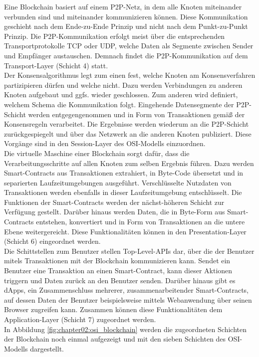 Eine Blockchain basiert auf einem \ac{P2P}-Netz, in dem alle Knoten miteinander verbunden sind und miteinander kommunizieren können. Diese Kommunikation geschieht nach dem Ende-zu-Ende Prinzip und nicht nach dem Punkt-zu-Punkt Prinzip. Die \ac{P2P}-Kommunikation erfolgt meist über die entsprechenden Transportprotokolle TCP oder UDP, welche Daten als Segmente zwischen Sender und Empfänger austauschen. Demnach findet die \ac{P2P}-Kommunikation auf dem Transport-Layer (Schicht 4) statt.\\
Der Konsensalgorithmus legt zum einen fest, welche Knoten am Konsensverfahren partizipieren dürfen und welche nicht. Dazu werden Verbindungen zu anderen Knoten aufgebaut und ggfs. wieder geschlossen. Zum anderen wird definiert, welchem Schema die Kommunikation folgt. Eingehende Datensegmente der \ac{P2P}-Schicht werden entgegengenommen und in Form von Transaktionen gemäß der Konsensregeln verarbeitet. Die Ergebnisse werden wiederum an die \ac{P2P}-Schicht zurückgespiegelt und über das Netzwerk an die anderen Knoten publiziert. Diese Vorgänge sind in den Session-Layer des \ac{OSI}-Modells einzuordnen.\\
Die virtuelle Maschine einer Blockchain sorgt dafür, dass die Verarbeitungsschritte auf allen Knoten zum selben Ergebnis führen. Dazu werden Smart-Contracts aus Transaktionen extrahiert, in Byte-Code übersetzt und in separierten Laufzeitumgebungen ausgeführt. Verschlüsselte Nutzdaten von Transaktionen werden ebenfalls in dieser Laufzeitumgebung entschlüsselt. Die Funktionen der Smart-Contracts werden der nächst-höheren Schicht zur Verfügung gestellt. Darüber hinaus werden Daten, die in Byte-Form aus Smart-Contracts entstehen, konvertiert und in Form von Transaktionen an die untere Ebene weitergereicht. Diese Funktionalitäten können in den Presentation-Layer (Schicht 6) eingeordnet werden.\\
Die Schittstellen zum Benutzer stellen Top-Level-\ac{API}s dar, über die der Benutzer mitels Transaktionen mit der Blockchain kommunizieren kann. Sendet ein Benutzer eine Transaktion an einen Smart-Contract, kann dieser Aktionen triggern und Daten zurück an den Benutzer senden. Darüber hinaus gibt es dApps, ein Zusammenschluss mehrerer, zusammenarbeitender Smart-Contracts, auf dessen Daten der Benutzer beispielsweise mittels Webanwendung über seinen Browser zugreifen kann. Zusammen können diese Funktionalitäten dem Application-Layer (Schicht 7) zugeordnet werden.\\

In Abbildung \ref{fig:chapter02:osi_blockchain} werden die zugeordneten Schichten der Blockchain noch einmal aufgezeigt und mit den sieben Schichten des \ac{OSI}-Modells dargestellt.

